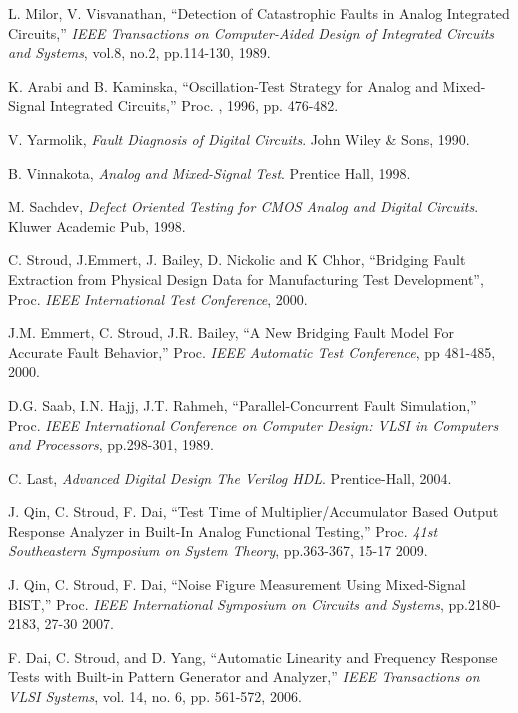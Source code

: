 \documentclass[12pt]{report}
\begin{document}
\begin{thebibliography}{99}
 L. Milor, V. Visvanathan, ``Detection of Catastrophic Faults in Analog Integrated Circuits,'' \textit{IEEE Transactions on Computer-Aided Design of Integrated Circuits and Systems}, vol.8, no.2, pp.114-130, 1989.

 K. Arabi and B. Kaminska, ``Oscillation-Test Strategy for Analog and Mixed-Signal Integrated Circuits,'' Proc. ,  1996, pp. 476-482.

 V. Yarmolik, \textit{Fault Diagnosis of Digital Circuits}. John Wiley & Sons, 1990.

 B. Vinnakota, \textit{Analog and Mixed-Signal Test}. Prentice Hall, 1998.

 M. Sachdev, \textit{Defect Oriented Testing for CMOS Analog and Digital Circuits}.  Kluwer Academic Pub, 1998.

 C. Stroud, J.Emmert, J. Bailey, D. Nickolic and K Chhor, ``Bridging Fault Extraction from Physical Design Data for Manufacturing Test Development'', Proc. \textit{IEEE International Test Conference}, 2000.

 J.M. Emmert, C. Stroud, J.R. Bailey, ``A New Bridging Fault Model For Accurate Fault Behavior,'' Proc. \textit{IEEE Automatic Test Conference}, pp 481-485, 2000.

 D.G. Saab, I.N. Hajj, J.T. Rahmeh, ``Parallel-Concurrent Fault Simulation,'' Proc. \textit{IEEE International Conference on Computer Design: VLSI in Computers and Processors}, pp.298-301, 1989.

 C. Last, \textit{Advanced Digital Design The Verilog HDL}.  Prentice-Hall, 2004.

 J. Qin, C. Stroud, F. Dai, ``Test Time of Multiplier/Accumulator Based Output Response Analyzer in Built-In Analog Functional Testing,'' Proc. \textit{41st Southeastern Symposium on System Theory}, pp.363-367, 15-17 2009.

 J. Qin, C. Stroud, F. Dai, ``Noise Figure Measurement Using Mixed-Signal BIST,'' Proc. \textit{IEEE International Symposium on Circuits and Systems}, pp.2180-2183, 27-30 2007.

 F. Dai, C. Stroud, and D. Yang, ``Automatic Linearity and Frequency Response Tests with Built-in Pattern Generator and Analyzer,''  \textit{IEEE Transactions on VLSI Systems}, vol. 14, no. 6, pp. 561-572, 2006.


\end{thebibliography}
\end{document}
